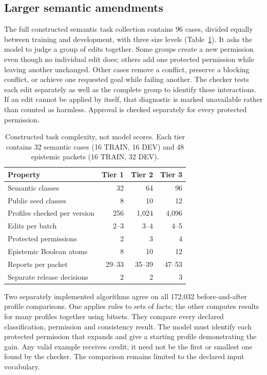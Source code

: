 \documentclass[a4paper,preprint,12pt,numbers,nopreprintline]{elsarticle}
\begin{document}
\subsection{Larger semantic amendments}
The full constructed semantic task collection contains 96 cases, divided equally between training and development, with three size levels (Table~\ref{tab:challenge-tiers}). It asks the model to judge a group of edits together. Some groups create a new permission even though no individual edit does; others add one protected permission while leaving another unchanged. Other cases remove a conflict, preserve a blocking conflict, or achieve one requested goal while failing another. The checker tests each edit separately as well as the complete group to identify these interactions. If an edit cannot be applied by itself, that diagnostic is marked unavailable rather than counted as harmless. Approval is checked separately for every protected permission.

\begin{table}[htbp]\centering\small
\caption{Constructed task complexity, not model scores. Each tier contains 32 semantic cases (16 TRAIN, 16 DEV) and 48 epistemic packets (16 TRAIN, 32 DEV).}\label{tab:challenge-tiers}
\begin{tabular}{lrrr}\toprule
Property & Tier 1 & Tier 2 & Tier 3\\\midrule
Semantic classes & 32 & 64 & 96\\
Public seed classes & 8 & 10 & 12\\
Profiles checked per version & 256 & 1,024 & 4,096\\
Edits per batch & 2--3 & 3--4 & 4--5\\
Protected permissions & 2 & 3 & 4\\
Epistemic Boolean atoms & 8 & 10 & 12\\
Reports per packet & 29--33 & 35--39 & 47--53\\
Separate release decisions & 2 & 2 & 3\\\bottomrule
\end{tabular}\end{table}

Two separately implemented algorithms agree on all 172,032 before-and-after profile comparisons. One applies rules to sets of facts; the other computes results for many profiles together using bitsets. They compare every declared classification, permission and consistency result. The model must identify each protected permission that expands and give a starting profile demonstrating the gain. Any valid example receives credit; it need not be the first or smallest one found by the checker. The comparison remains limited to the declared input vocabulary.
\end{document}
